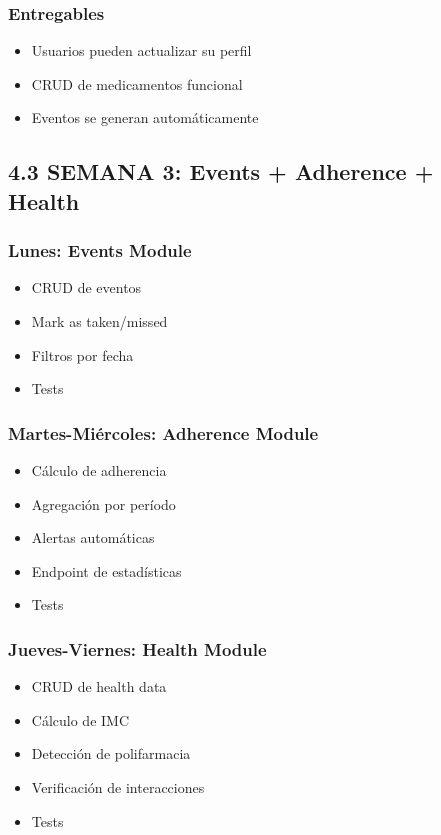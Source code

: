 \documentclass[12pt,a4paper]{article}
\begin{document}
\subsubsection{Entregables}
\begin{itemize}
    \item Usuarios pueden actualizar su perfil
    \item CRUD de medicamentos funcional
    \item Eventos se generan automáticamente
\end{itemize}

\subsection{4.3 SEMANA 3: Events + Adherence + Health}

\subsubsection{Lunes: Events Module}
\begin{itemize}
    \item CRUD de eventos
    \item Mark as taken/missed
    \item Filtros por fecha
    \item Tests
\end{itemize}

\subsubsection{Martes-Miércoles: Adherence Module}
\begin{itemize}
    \item Cálculo de adherencia
    \item Agregación por período
    \item Alertas automáticas
    \item Endpoint de estadísticas
    \item Tests
\end{itemize}

\subsubsection{Jueves-Viernes: Health Module}
\begin{itemize}
    \item CRUD de health data
    \item Cálculo de IMC
    \item Detección de polifarmacia
    \item Verificación de interacciones
    \item Tests
\end{itemize}
\end{document}
